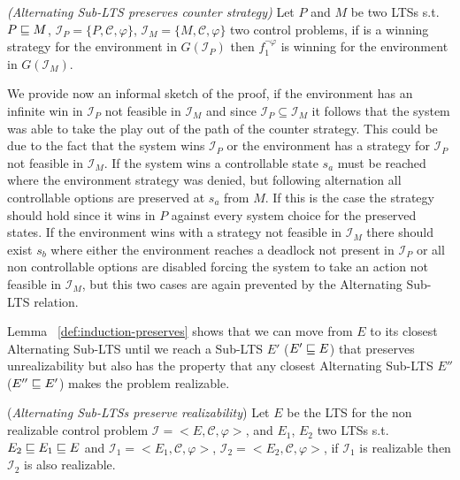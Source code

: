 \begin{lemma}\emph{(Alternating Sub-LTS preserves counter strategy)}\label{theorem:theo.preserves-non-realizability}
Let $P$ and $M$ be two LTSs s.t. $P \sqsubseteq M$, 
$\mathcal{I}_P = \lbrace P, \mathcal{C}, \varphi \rbrace$,
$\mathcal{I}_M = \lbrace M, \mathcal{C}, \varphi \rbrace$
two control problems, if
 \counterS is a winning strategy for
the environment in $G(\mathcal{I}_P)$ 
then $f_1^{\neg \varphi}$ is winning for the environment in
$G(\mathcal{I}_M)$.
\end{lemma}

We provide now an informal sketch of the proof, if the environment has an infinite
win in $\mathcal{I}_P$ not feasible in $\mathcal{I}_M$ and since $\mathcal{I}_P \subseteq \mathcal{I}_M$
it follows that the system was able to take the play
out of the path of the counter strategy.  This could be due to the fact that the system wins $\mathcal{I}_P$ or the environment has a strategy for  $\mathcal{I}_P$ not feasible in $\mathcal{I}_M$. If the system wins a controllable state $s_a$ must be reached where the environment strategy was denied, but following alternation all controllable options are
preserved at $s_a$ from $M$.  If this is the case the strategy should
hold since it wins in $P$ against every system choice for
the preserved states. If the environment wins with a strategy not feasible in $\mathcal{I}_M$ there should exist $s_b$ where either the environment reaches a deadlock not present in $\mathcal{I}_P$ or all non controllable options are disabled forcing the system to take an action not feasible in $\mathcal{I}_M$, but this two cases are again prevented by the Alternating Sub-LTS relation.  

Lemma ~\ref{def:induction-preserves} shows that we can move from $E$ to its closest Alternating Sub-LTS until we reach a Sub-LTS $E'$ ($E' \sqsubseteq E$) that preserves unrealizability but also has the property that any closest Alternating Sub-LTS $E''$ ($E'' \sqsubseteq E'$)  makes the problem realizable.
\begin{lemma}\label{def:induction-preserves}(\emph{Alternating Sub-LTSs preserve realizability})
	Let $E$ be the LTS for the non realizable control problem
	$\mathcal{I}=<E,\mathcal{C}, \varphi>$, and $E_1$, $E_2$ two LTSs s.t. 
	$E_2 \sqsubseteq E_1 \sqsubseteq E$ and
	$\mathcal{I}_1=<E_1, \mathcal{C}, \varphi>$, $\mathcal{I}_2=<E_2, \mathcal{C}, \varphi>$, if $\mathcal{I}_1$ is realizable then $\mathcal{I}_2$ is also realizable.
\end{lemma}

